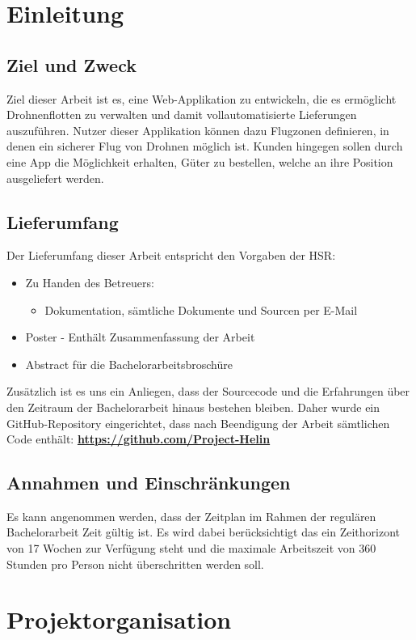\section{Einleitung}
\subsection{Ziel und Zweck}
Ziel dieser Arbeit ist es, eine Web-Applikation zu entwickeln, die es ermöglicht Drohnenflotten zu verwalten und damit vollautomatisierte Lieferungen auszuführen. Nutzer dieser Applikation können dazu Flugzonen definieren, in denen ein sicherer Flug von Drohnen möglich ist. Kunden hingegen sollen durch eine App die Möglichkeit erhalten, Güter zu bestellen, welche an ihre Position ausgeliefert werden.

\subsection{Lieferumfang}
Der Lieferumfang dieser Arbeit entspricht den Vorgaben der HSR:
\begin{itemize}
	\item{Zu Handen des Betreuers:
	\begin{itemize}
		\item{Dokumentation, sämtliche Dokumente und Sourcen per E-Mail}
	\end{itemize}}
	\item{Poster - Enthält Zusammenfassung der Arbeit}
	\item{Abstract für die Bachelorarbeitsbroschüre}
\end{itemize}
Zusätzlich ist es uns ein Anliegen, dass der Sourcecode und die Erfahrungen über den Zeitraum der Bachelorarbeit hinaus bestehen bleiben. Daher wurde ein GitHub-Repository eingerichtet, dass nach Beendigung der Arbeit sämtlichen Code enthält: \textbf{\url{https://github.com/Project-Helin}}

\subsection{Annahmen und Einschränkungen}
Es kann angenommen werden, dass der Zeitplan im Rahmen der regulären Bachelorarbeit Zeit gültig ist. Es wird dabei berücksichtigt das ein Zeithorizont von 17 Wochen zur Verfügung steht und die maximale Arbeitszeit von 360 Stunden pro Person nicht überschritten werden soll.
\section{Projektorganisation}
